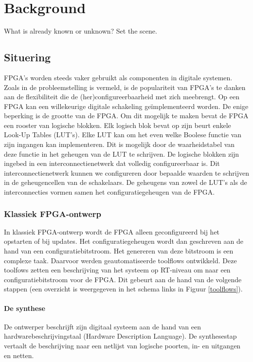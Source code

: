 \documentclass[a4paper,oneside,12pt]{article}
\begin{document}
\newpage

\section{Background}
What is already known or unknown? Set the scene.

\subsection{Situering}

FPGA's worden steeds vaker gebruikt als componenten in digitale systemen. Zoals in de probleemstelling is vermeld, is de populariteit van FPGA's te danken aan de flexibiliteit die de (her)configureerbaarheid met zich meebrengt. Op een FPGA kan een willekeurige digitale schakeling ge\"implementeerd worden. De enige beperking is de grootte van de FPGA. Om dit mogelijk te maken bevat de FPGA een rooster van logische blokken. Elk logisch blok bevat op zijn beurt enkele Look-Up Tables (LUT's). Elke LUT kan om het even welke Boolese functie van zijn ingangen kan implementeren. Dit is mogelijk door de waarheidstabel van deze functie in het geheugen van de LUT te schrijven. De logische blokken zijn ingebed in een interconnectienetwerk dat volledig configureerbaar is. Dit interconnectienetwerk kunnen we configureren door bepaalde waarden te schrijven in de geheugencellen van de schakelaars. De geheugens van zowel de LUT's als de interconnecties vormen samen het configuratiegeheugen van de FPGA. 

\subsubsection{Klassiek FPGA-ontwerp}
In klassiek FPGA-ontwerp wordt de FPGA alleen geconfigureerd bij het opstarten of bij updates. Het configuratiegeheugen wordt dan geschreven aan de hand van een configuratiebitstroom. Het genereren van deze bitstroom is een complexe taak. Daarvoor werden geautomatiseerde toolflows ontwikkeld. Deze toolfows zetten een beschrijving van het systeem op RT-niveau om naar een configuratiebitstroom voor de FPGA. Dit gebeurt aan de hand van de volgende stappen (een overzicht is weergegeven in het schema links in Figuur \ref{toolflows}).

\paragraph{De synthese}
De ontwerper beschrijft zijn digitaal systeem aan de hand van een hardwarebeschrijvingstaal (Hardware Description Language). De synthesestap vertaalt de beschrijving naar een netlijst van logische poorten, in- en uitgangen en netten.
\end{document}
